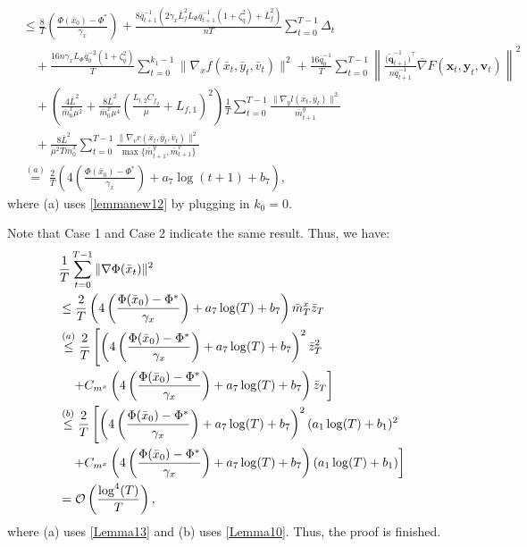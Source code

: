 \documentclass{article}
\theoremstyle{plain}
\theoremstyle{definition}
\theoremstyle{remark}
\begin{document}
\begin{align}
&\leq \frac{8}{T}\left(\frac{\Phi(\bar{x}_0)-\Phi^*}{\gamma_x}\right)+\frac{8\bar{q}_{t+1}^{-1}(2\gamma_x \bar{L}_{f}^2L_\Phi \bar{q}_{t+1}^{-1} \left(1 +\zeta_q^2\right)+\bar{L}_{f}^2)}{nT} \sum_{t=0}^{T-1}\Delta_t\nonumber\\
&\quad +\frac{16n\gamma_x L_\Phi \bar{q}_{0}^{-2} \left(1 +\zeta_q^2\right)}{T}\sum_{t=0}^{k_1-1}\|\nabla_x f(\bar{x}_t, \bar{y}_t, \bar{v}_t)\|^2
+ \frac{16\bar{q}_{0}^{-1}}{T}\sum_{t=0}^{T-1} \left\| \frac{\big(\tilde{\mathbf{q}}_{t+1}^{-1}\big)^\top}{n\bar{q}_{t+1}^{-1}} \bar{\nabla} F(\mathbf{x}_t, \mathbf{y}_t, \mathbf{v}_t) \right\|^2 \nonumber \\
&\quad +\left( \frac{4\bar{L}^2}{\bar{m}^x_{0}\mu^2} + \frac{8\bar{L}^2}{\bar{m}^x_{0}\mu^4} \left( \frac{L_{l,2} C_{f_y}}{\mu} + L_{f,1} \right)^2 \right)\frac{1}{T}\sum_{t=0}^{T-1}\frac{\|\nabla_y l(\bar{x}_t, \bar{y}_t)\|^2}{\bar{m}^y_{t+1}}\nonumber\\
&\quad+ \frac{8\bar{L}^2 }{\mu^2T\bar{m}^x_{0}}\sum_{t=0}^{T-1}\frac{\|\nabla_v r(\bar{x}_t, \bar{y}_t, \bar{v}_t)\|^2}{\max\{\bar{m}^y_{t+1},\bar{m}^v_{t+1}\}}\nonumber\\
&\overset{(a)}{=}\frac{2}{T}\left(4\left(\frac{\Phi(\bar{x}_0)-\Phi^*}{\gamma_x}\right)+a_7\log(t+1)+b_7\right),\label{eq142}
\end{align}
where (a) uses \cref{lemmanew12} by plugging in $k_0=0$.

Note that Case 1 and Case 2 indicate the same result. Thus, we have:
\begin{align}
&\frac{1}{T} \sum_{t=0}^{T-1} \|\nabla \Phi(\bar{x}_t)\|^2\nonumber\\
&\leq \frac{2}{T}\left(4\left(\frac{\Phi(\bar{x}_0)-\Phi^*}{\gamma_x}\right)+a_7\log(T)+b_7\right)\bar{m}^x_T \bar{z}_T\nonumber \\
&\overset{(a)}{\leq} \frac{2}{T}\left[\left(4\left(\frac{\Phi(\bar{x}_0)-\Phi^*}{\gamma_x}\right)+a_7\log(T)+b_7\right)^2{\bar{z}_T^2} \right. \notag\\
&\quad\left.+ C_{m^x} \left(4\left(\frac{\Phi(\bar{x}_0)-\Phi^*}{\gamma_x}\right)+a_7\log(T)+b_7\right)\bar{z}_T\right] \nonumber \\
&\overset{(b)}{\leq} \frac{2}{T}\left[\left(4\left(\frac{\Phi(\bar{x}_0)-\Phi^*}{\gamma_x}\right)+a_7\log(T)+b_7\right)^2{(a_1 \log(T) + b_1)^2}  \right.\nonumber\\
&\quad \left.+ C_{m^x} \left(4\left(\frac{\Phi(\bar{x}_0)-\Phi^*}{\gamma_x}\right)+a_7\log(T)+b_7\right)(a_1 \log(T) + b_1)\right]\nonumber \\
&= \mathcal{O}\left(\frac{\log^4(T)}{T}\right),\label{eq143}
\end{align}
where (a) uses \cref{Lemma13} and (b) uses \cref{Lemma10}. Thus, the proof is finished.
\end{document}
